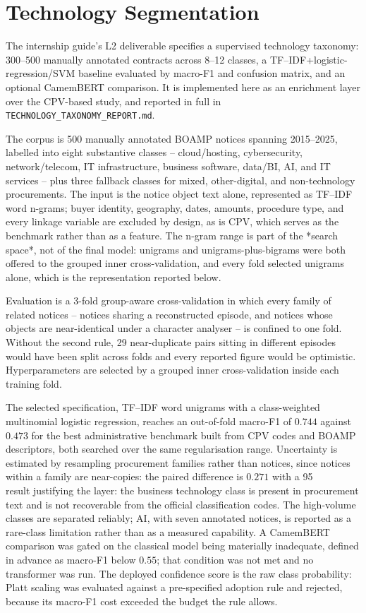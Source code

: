 \documentclass[11pt,a4paper]{article}
\newcommand{\pathcode}[1]{\texttt{\small #1}}
\begin{document}
\section{Technology Segmentation}
\label{sec:nlp-scope}
The internship guide's L2 deliverable specifies a supervised technology
taxonomy: 300--500 manually annotated contracts across 8--12 classes, a
TF--IDF+logistic-regression/SVM baseline evaluated by macro-F1 and confusion
matrix, and an optional CamemBERT comparison. It is implemented here as an
enrichment layer over the CPV-based study, and reported in full in
\pathcode{TECHNOLOGY\_TAXONOMY\_REPORT.md}.

The corpus is 500 manually annotated BOAMP notices spanning 2015--2025, labelled
into eight substantive classes -- cloud/hosting, cybersecurity,
network/telecom, IT infrastructure, business software, data/BI, AI, and IT
services -- plus three fallback classes for mixed, other-digital, and
non-technology procurements. The input is the notice object text alone,
represented as TF--IDF word n-grams; buyer identity, geography,
dates, amounts, procedure type, and every linkage variable are excluded by
design, as is CPV, which serves as the benchmark rather than as a feature.
The n-gram range is part of the *search space*, not of the final model: unigrams
and unigrams-plus-bigrams were both offered to the grouped inner
cross-validation, and every fold selected unigrams alone, which is the
representation reported below.

Evaluation is a 3-fold group-aware cross-validation in which every family of
related notices -- notices sharing a reconstructed episode, and notices whose
objects are near-identical under a character analyser -- is confined to one
fold. Without the second rule, 29 near-duplicate pairs sitting in different
episodes would have been split across folds and every reported figure would be
optimistic. Hyperparameters are selected by a grouped inner cross-validation
inside each training fold.

The selected specification, TF--IDF word unigrams with a class-weighted
multinomial logistic regression, reaches an out-of-fold macro-F1 of $0.744$
against $0.473$ for the best administrative benchmark built from CPV codes and
BOAMP descriptors, both searched over the same regularisation range. Uncertainty
is estimated by resampling procurement families rather than notices, since
notices within a family are near-copies: the paired difference is $0.271$ with a
95\\%
result justifying the layer: the business technology class is present in
procurement text and is not recoverable from the official classification codes. The high-volume classes are separated reliably;
AI, with seven annotated notices, is reported as a rare-class limitation rather
than as a measured capability. A CamemBERT comparison was gated on the classical
model being materially inadequate, defined in advance as macro-F1 below $0.55$;
that condition was not met and no transformer was run. The deployed confidence
score is the raw class probability: Platt scaling was evaluated against a
pre-specified adoption rule and rejected, because its macro-F1 cost exceeded the budget the rule allows.
\end{document}
